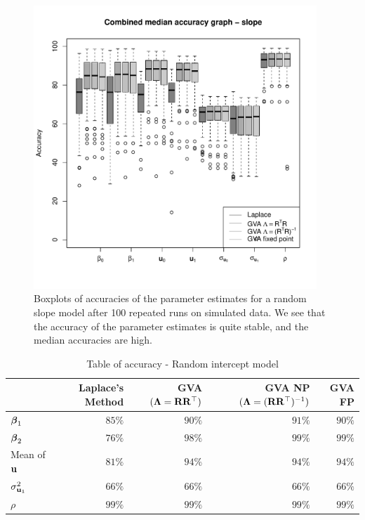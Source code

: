 \begin{figure}[h]
	\includegraphics[width=0.95\textwidth]{code/results/median_accuracy_combined_slope.pdf}
	\caption{Boxplots of accuracies of the parameter estimates for a random slope model after 100 repeated
							runs on simulated data. We see that the accuracy of the parameter estimates is quite stable,
							and the median accuracies are high.}
	\label{fig:median_accuracy_slope}
\end{figure}
		
\begin{table}
	\begin{tabular}{|l|rrrr|}
		\hline
		                   & Laplace's Method & GVA $({\boldsymbol \Lambda} = {\bf R} {\bf R}^\top)$ & GVA NP $({\boldsymbol \Lambda} = ({\bf R} {\bf R}^\top)^{-1})$ & GVA FP \\
		\hline
		${\boldsymbol \beta}_1$         & $85\%$           & $90\%$                          & $91\%$                                    & $90\%$ \\ 
		${\boldsymbol \beta}_2$         & $76\%$           & $98\%$                          & $99\%$                                    & $99\%$ \\ 
		Mean of ${\bf u}$      & $81\%$           & $94\%$                          & $94\%$                                    & $94\%$ \\
		$\sigma^2_{{\bf u}_1}$ & $66\%$           & $66\%$                          & $66\%$                                    & $66\%$ \\ 
		$\rho$             & $99\%$           & $99\%$                          & $99\%$                                    & $99\%$ \\ 
		\hline
	\end{tabular}
	\caption{Table of accuracy - Random intercept model}
	\label{tab:accuracy_int}
\end{table}
		
